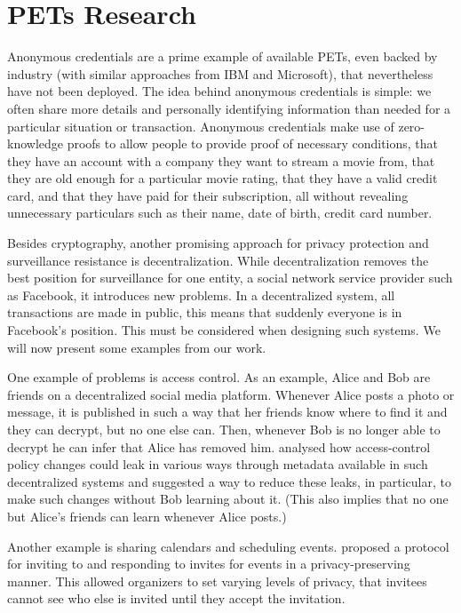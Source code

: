 \section{\acp{PET} Research}

Anonymous credentials are a prime example of available \acp{PET},
even backed by industry (with similar approaches from IBM and
Microsoft), that nevertheless have not been deployed. The idea behind
anonymous credentials is simple: we often share more details and
personally identifying information than needed for a particular
situation or transaction. Anonymous credentials make use of
zero-knowledge proofs to allow people to provide proof of necessary
conditions, \eg that they have an account with a company they want to
stream a movie from, that they are old enough for a particular movie
rating, that they have a valid credit card, and that they have paid
for their subscription, all without revealing unnecessary particulars
such as their name, date of birth, credit card number. 

Besides cryptography, another promising approach for privacy
protection and surveillance resistance is decentralization. 
While decentralization removes the best position for surveillance for one entity, \eg 
a social network service provider such as Facebook, it introduces new problems.
In a decentralized system, all transactions are made in public, this means that 
suddenly everyone is in Facebook's position.
This must be considered when designing such systems.
We will now present some examples from our work.

One example of problems is access control.
As an example, Alice and Bob are friends on a decentralized social media 
platform.
Whenever Alice posts a photo or message, it is published in such a way that her 
friends know where to find it and they can decrypt, but no one else can.
Then, whenever Bob is no longer able to decrypt he can infer that Alice has 
removed him.
\Textcite{PPACinPubFS} analysed how access-control policy changes could leak in 
various ways through metadata available in such decentralized systems and 
suggested a way to reduce these leaks, in particular, to make such changes 
without Bob learning about it.
(This also implies that no one but Alice's friends can learn whenever Alice 
posts.)

Another example is sharing calendars and scheduling events.
\Textcite{EventsInvitations} proposed a protocol for inviting to and responding 
to invites for events in a privacy-preserving manner.
This allowed organizers to set varying levels of privacy, \eg that invitees 
cannot see who else is invited until they accept the invitation.

